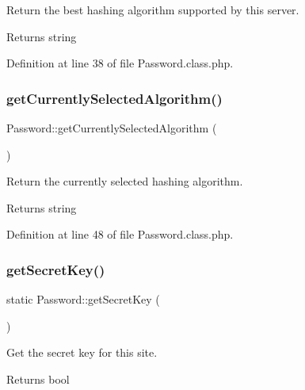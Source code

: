 Return the best hashing algorithm supported by this server. 

\begin{DoxyReturn}{Returns}
string 
\end{DoxyReturn}


Definition at line 38 of file Password.\+class.\+php.

\hypertarget{classPassword_afd4c3a1daf246f73845a1f0c60cd17d8}{}\label{classPassword_afd4c3a1daf246f73845a1f0c60cd17d8} 
\subsubsection{\texorpdfstring{get\+Currently\+Selected\+Algorithm()}{getCurrentlySelectedAlgorithm()}}
{\footnotesize\ttfamily Password\+::get\+Currently\+Selected\+Algorithm (\begin{DoxyParamCaption}{ }\end{DoxyParamCaption})}



Return the currently selected hashing algorithm. 

\begin{DoxyReturn}{Returns}
string 
\end{DoxyReturn}


Definition at line 48 of file Password.\+class.\+php.

\hypertarget{classPassword_a34c9775ddb1701f8b136f872559c0fcc}{}\label{classPassword_a34c9775ddb1701f8b136f872559c0fcc} 
\subsubsection{\texorpdfstring{get\+Secret\+Key()}{getSecretKey()}}
{\footnotesize\ttfamily static Password\+::get\+Secret\+Key (\begin{DoxyParamCaption}{ }\end{DoxyParamCaption})\hspace{0.3cm}{\ttfamily [static]}}



Get the secret key for this site. 

\begin{DoxyReturn}{Returns}
bool 
\end{DoxyReturn}


